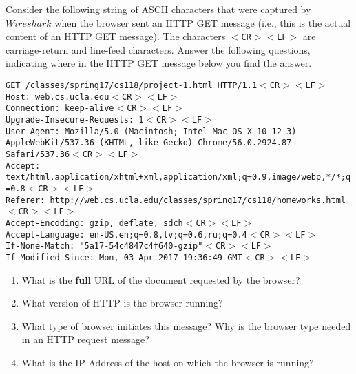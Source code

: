 \documentclass{report}
\begin{document}
\mktitle

\begin{problem}


\newcommand{\ENDL}{$<$CR$>$$<$LF$>$}

Consider the following string of ASCII characters that were captured by
$Wireshark$ when the browser sent an HTTP GET message (i.e., this is the
actual content of an HTTP GET message). The characters \texttt{\ENDL{}} are
carriage-return and line-feed characters. Answer the following questions,
indicating where in the HTTP GET message below you find the answer.\\

\begin{raggedright}
\texttt{GET /classes/spring17/cs118/project-1.html HTTP/1.1\ENDL\\
Host: web.cs.ucla.edu\ENDL\\
Connection: keep-alive\ENDL\\
Upgrade-Insecure-Requests: 1\ENDL\\
User-Agent: Mozilla/5.0 (Macintosh; Intel Mac OS X 10\_12\_3) AppleWebKit/537.36 (KHTML, like Gecko) Chrome/56.0.2924.87 Safari/537.36\ENDL\\
Accept: text/html,application/xhtml+xml,application/xml;q=0.9,image/webp,*/*;q=0.8\ENDL\\
Referer: http://web.cs.ucla.edu/classes/spring17/cs118/homeworks.html\ENDL\\
Accept-Encoding: gzip, deflate, sdch\ENDL\\
Accept-Language: en-US,en;q=0.8,lv;q=0.6,ru;q=0.4\ENDL\\
If-None-Match: "5a17-54c4847c4f640-gzip"\ENDL\\
If-Modified-Since: Mon, 03 Apr 2017 19:36:49 GMT\ENDL\\
}
\end{raggedright}

\begin{enumerate}
\item What is the \textbf{full} URL of the document requested by the browser?
\item What version of HTTP is the browser running?
\item What type of browser initiates this message? Why is the browser type
      needed in an HTTP  request message?
\item What is the IP Address of the host on which the browser is running?
\end{enumerate}


\end{problem}
\end{document}
